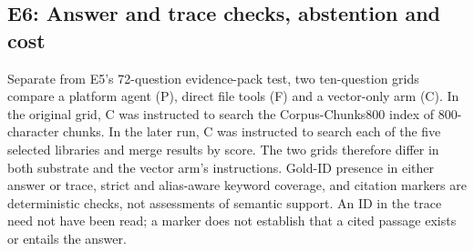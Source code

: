 
\subsection{E6: Answer and trace checks, abstention and cost}
\label{sec:e5}
\label{sec:agentic}\label{sec:abstention}\label{sec:composition}\label{sec:eval-agent}
Separate from E5's 72-question evidence-pack test, two ten-question grids
compare a platform agent (P), direct file tools (F) and a vector-only arm (C). In the original grid, C was instructed to search
the Corpus-Chunks800 index of 800-character chunks. In the later run, C was
instructed to search each of the five selected libraries and merge results by
score. The two grids therefore differ in both substrate and the vector arm's
instructions. Gold-ID presence in either answer or trace, strict and alias-aware keyword
coverage, and citation markers are deterministic checks, not assessments of
semantic support. An ID in the trace need not have been read; a marker does not
establish that a cited passage exists or entails the answer.

